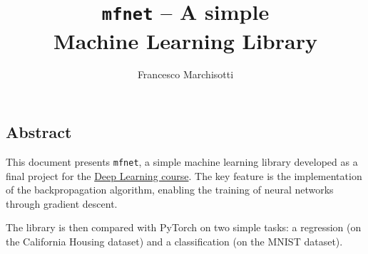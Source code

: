 \documentclass{unitothesis}
\author{Francesco Marchisotti}
\title{\centering\texttt{mfnet} -- A simple\\[0.5em] Machine Learning Library}
\begin{document}
\maketitlepage
\thispagestyle{empty}
\subsection*{\centering Abstract}
This document presents \texttt{mfnet}, a simple machine learning library developed as a final project for the \href{https://fisica-sc.campusnet.unito.it/do/storicocorsi.pl/Show?_id=curx_2324}{Deep Learning course}. The key feature is the implementation of the backpropagation algorithm, enabling the training of neural networks through gradient descent.

The library is then compared with PyTorch on two simple tasks: a regression (on the California Housing dataset) and a classification (on the MNIST dataset).
\newpage

{\hypersetup{linkcolor=black}\tableofcontents}





% 
% 
% 
% 
% 



% 
\end{document}
